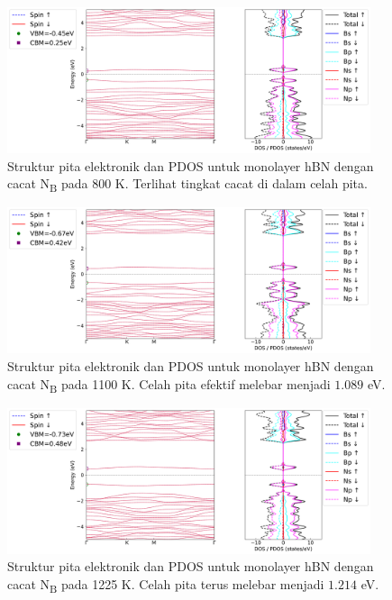 \begin{figure}[htbp!] %
    \centering
    \includegraphics[width=0.95\textwidth]{gambar_hasil/simple_bands_pdos_NN_800K.png}
    \caption{Struktur pita elektronik dan PDOS untuk monolayer hBN dengan cacat N\textsubscript{B} pada 800 K. Terlihat tingkat cacat di dalam celah pita.}
    \label{fig:hbn_NN_800K}
\end{figure}
\begin{figure}[htbp!] %
    \centering
    \includegraphics[width=0.95\textwidth]{gambar_hasil/simple_bands_pdos_NN_1100K.png}
    \caption{Struktur pita elektronik dan PDOS untuk monolayer hBN dengan cacat N\textsubscript{B} pada 1100 K. Celah pita efektif melebar menjadi $1.089$ eV.}
    \label{fig:hbn_NN_1100K}
\end{figure}
\begin{figure}[htbp!] %
    \centering
    \includegraphics[width=0.95\textwidth]{gambar_hasil/simple_bands_pdos_NN_1225K.png}
    \caption{Struktur pita elektronik dan PDOS untuk monolayer hBN dengan cacat N\textsubscript{B} pada 1225 K. Celah pita terus melebar menjadi $1.214$ eV.}
    \label{fig:hbn_NN_1225K}
\end{figure}


